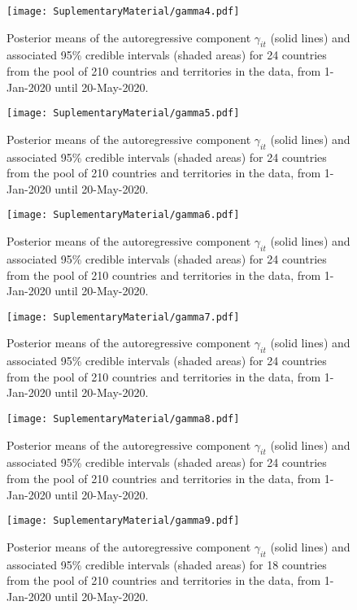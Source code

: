 \documentclass[fleqn,10pt]{wlscirep}
\begin{document}
\begin{figure}[ht!]
    \centering
    \texttt{[image: SuplementaryMaterial/gamma4.pdf]}
    \caption{Posterior means of the autoregressive component $\gamma_{it}$ (solid lines) and associated 95\% credible intervals (shaded areas) for 24 countries from the pool of 210 countries and territories in the data, from 1-Jan-2020 until 20-May-2020.}
\end{figure}

\begin{figure}[ht!]
    \centering
    \texttt{[image: SuplementaryMaterial/gamma5.pdf]}
    \caption{Posterior means of the autoregressive component $\gamma_{it}$ (solid lines) and associated 95\% credible intervals (shaded areas) for 24 countries from the pool of 210 countries and territories in the data, from 1-Jan-2020 until 20-May-2020.}
\end{figure}

\begin{figure}[ht!]
    \centering
    \texttt{[image: SuplementaryMaterial/gamma6.pdf]}
    \caption{Posterior means of the autoregressive component $\gamma_{it}$ (solid lines) and associated 95\% credible intervals (shaded areas) for 24 countries from the pool of 210 countries and territories in the data, from 1-Jan-2020 until 20-May-2020.}
\end{figure}

\begin{figure}[ht!]
    \centering
    \texttt{[image: SuplementaryMaterial/gamma7.pdf]}
    \caption{Posterior means of the autoregressive component $\gamma_{it}$ (solid lines) and associated 95\% credible intervals (shaded areas) for 24 countries from the pool of 210 countries and territories in the data, from 1-Jan-2020 until 20-May-2020.}
\end{figure}

\begin{figure}[ht!]
    \centering
    \texttt{[image: SuplementaryMaterial/gamma8.pdf]}
    \caption{Posterior means of the autoregressive component $\gamma_{it}$ (solid lines) and associated 95\% credible intervals (shaded areas) for 24 countries from the pool of 210 countries and territories in the data, from 1-Jan-2020 until 20-May-2020.}
\end{figure}

\begin{figure}[ht!]
    \centering
    \texttt{[image: SuplementaryMaterial/gamma9.pdf]}
    \caption{Posterior means of the autoregressive component $\gamma_{it}$ (solid lines) and associated 95\% credible intervals (shaded areas) for 18 countries from the pool of 210 countries and territories in the data, from 1-Jan-2020 until 20-May-2020.}
    \label{fig:gamma_suppl9}
\end{figure}
\end{document}
